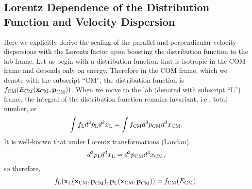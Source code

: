 \documentclass[usenatbib,iop,apj,numberedappendix]{aeb_emulateapj_2015}
\newcommand\bmath[1] {\mbox{\boldmath$\rm #1$}}
\newcommand{\pmom}{\ensuremath{\bmath{p}}}
\newcommand{\ppos}{\ensuremath{\bmath{x}}}
\newcommand{\fLAB}{\ensuremath{f_{\rm L}}}
\newcommand{\fCM}{\ensuremath{f_{\rm CM}}}
\newcommand{\dVLAB}{\ensuremath{d^3p_{\rm L} d^3x_{\rm L}}}
\newcommand{\dVCM}{\ensuremath{d^3p_{\rm CM} d^3x_{\rm CM}}}
\begin{document}
\begin{appendix}

\section{Lorentz Dependence of the Distribution Function and Velocity Dispersion}
\label{sec:lorentz}

Here we explicitly derive the scaling of the parallel and
perpendicular velocity dispersions with the Lorentz factor upon boosting the
distribution function to the lab frame. Let us begin with a distribution
function that is isotropic in the COM frame and depends only on energy.
Therefore in the COM frame, which we denote with the subscript ``CM'', the distribution
function is  $\fCM(E_{\rm CM}(\ppos_{\rm CM},\pmom_{\rm CM}))$.  When we move to the lab
(denoted with subscript ``L'') frame, the integral of the distribution function remains invariant,
i.e., total number, or
\begin{equation}
 \int \fLAB \dVLAB = \int \fCM \dVCM.
\end{equation}
It is well-known that under Lorentz transformations (Landau), 
\begin{equation}
 \dVLAB = \dVCM,
\end{equation}
so therefore,
\begin{equation}
  \fLAB(\ppos_{\rm L}(\ppos_{\rm CM},\pmom_{\rm CM}),\pmom_{\rm L}(\ppos_{\rm CM},\pmom_{\rm CM})) = \fCM(E_{\rm CM}).
\end{equation}


\end{appendix}
\end{document}
